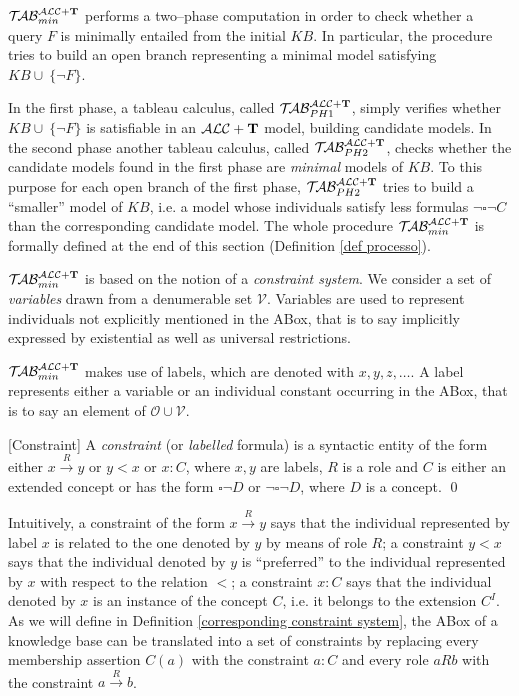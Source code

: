 \documentclass[a4paper, 11pt, oneside]{duthesis}
\newcommand{\tip}{{\bf T}}
\newcommand{\alct}{\mathcal{ALC}+\tip}
\newcommand{\unione} {\cup}
\newcommand{\nott} {\lnot}
\newcommand{\bbox}{\square}
\newcommand{\nuovoc}{\mathrel{{\mathcal{T}\!\mathcal{AB}}}_{min}^{\mathcal{ALC}+\mbox{\scriptsize $\tip$}}}
\newcommand{\primo}{\mathrel{{\mathcal{T}\!\mathcal{AB}}}_{PH 1}^{\mathcal{ALC}+\mbox{\scriptsize $\tip$}}}
\newcommand{\secondo}{\mathrel{{\mathcal{T}\!\mathcal{AB}}}_{PH 2}^{\mathcal{ALC}+\mbox{\scriptsize $\tip$}}}
\newcommand{\trans}[1]{\stackrel{#1}{\longrightarrow}}
\newenvironment{definition}
{\begin{defi} \rm}{\qed \end{defi}}
\newenvironment{definition}
{\begin{defi} \rm}{\qed \end{defi}}
\newtheorem{definition}{Definition}
\newcounter{posu}
\newtheorem{definition}[posu]{Definition}
\begin{document}
$\nuovoc$ performs a two--phase computation in order to check whether a query $F$ is minimally entailed from the initial $KB$.
In particular, the procedure tries to build an open branch representing a minimal model satisfying $KB \unione \ \{\nott F\}$.

\noindent In the first phase, a tableau calculus, called $\primo$, simply verifies whether $KB \unione \ \{\nott F\}$ is satisfiable in an $\alct$ model, building candidate models.
In the second phase another tableau calculus, called $\secondo$, checks whether the candidate models found in the first phase are \emph{minimal} models of $KB$.
To this purpose for each open branch of the first phase, $\secondo$ tries to build a ``smaller'' model of $KB$, i.e. a model whose individuals satisfy less formulas $\nott \bbox \nott C$ than the corresponding candidate model.
The whole procedure $\nuovoc$ is formally defined at the end of this section (Definition \ref{def processo}).

$\nuovoc$ is based on the notion of a \emph{constraint system}.
We consider a set of \emph{variables} drawn from a denumerable set $\mathcal{V}$.
Variables are used to represent individuals not explicitly mentioned in the ABox, that is to say implicitly expressed by existential as well as universal restrictions.


$\nuovoc$ makes use of labels, which are denoted with $x, y, z, \dots$.
A label represents either a variable or an individual constant occurring in the ABox, that is to say an element of $\mathcal{O} \unione \mathcal{V}$.

\begin{definition}[Constraint]
A \emph{constraint} (or \emph{labelled} formula) is a syntactic entity of the form either $x \trans{R} y$ or $y<x$ or $x: C$, where $x, y$ are labels, $R$ is a role and $C$ is either an extended concept or has the form $\bbox \nott D$ or $\nott \bbox \nott D$, where $D$ is a concept.
\end{definition}

\noindent Intuitively, a constraint of the form $x \trans{R} y$ says that the individual represented by label $x$ is related to the one denoted by $y$ by means of role $R$; a constraint $y<x$ says that the individual denoted by $y$ is ``preferred'' to the individual represented by $x$ with respect to the relation $<$; a constraint $x: C$ says that the individual denoted by $x$ is an instance of the concept $C$, i.e. it belongs to the extension $C^I$.
As we will define in Definition \ref{corresponding constraint system}, the ABox of a knowledge base can be translated into a set of constraints by replacing every membership assertion $C(a)$ with the constraint $a: C$ and every role $a R b$ with the constraint $a \trans{R} b$.
\end{document}
